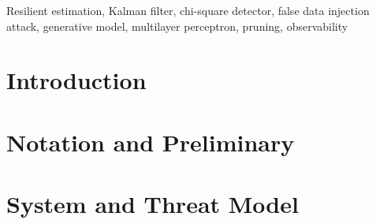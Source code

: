 \documentclass[journal]{IEEEtran}
\begin{document}
\begin{abstract}
This paper develops a resilient state-estimation framework for linear cyber-physical systems subject to sparse false-data injection attacks. A steady-state Kalman filter and a chi-square innovation detector are incorporated into a physics-guided attack generator. The generator uses the closed-loop attack-to-output map to quantify attack effectiveness and the attack-to-innovation map to quantify detection probability. Generated attacks are subsequently used to train a channel-wise localization network. Under explicit conditional-calibration and independence assumptions, calibrated safety probabilities are employed to select a measurement subset with a prescribed probability of being attack-free. The resulting analysis relates four quantities that are commonly treated separately: attack sparsity, sensor-set observability, localization reliability, and conditional Kalman-filter error covariance. A water-distribution case study reports the empirical observability profile and illustrates the localization improvement obtained from an earlier physics-guided training set; numerical validation of the revised KF/chi-square generator is left for future work.
\end{abstract}

\begin{IEEEkeywords}
Resilient estimation, Kalman filter, chi-square detector, false data injection attack, generative model, multilayer perceptron, pruning, observability
\end{IEEEkeywords}



\section{Introduction}\label{sec:Introduction}


\section{Notation and Preliminary}\label{sec:notation}



\section{System and Threat Model}\label{sec:system_model}

\end{document}
